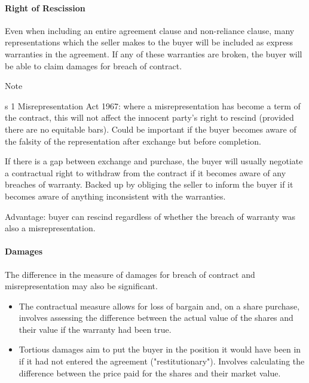\documentclass[
]{article}
\providecommand{\tightlist}{%
  \setlength{\itemsep}{0pt}\setlength{\parskip}{0pt}}
\newenvironment{env-48e9bfc8-c3dd-4504-a5fa-3b34b9a27ccf}
{
    \savenotes\tcolorbox[blanker,breakable,left=5pt,borderline west={2pt}{-4pt}{blue}]
}
{
    \endtcolorbox\spewnotes
}
\begin{document}
\hypertarget{right-of-rescission}{%
\paragraph{Right of Rescission}\label{right-of-rescission}}

Even when including an entire agreement clause and non-reliance clause,
many representations which the seller makes to the buyer will be
included as express warranties in the agreement. If any of these
warranties are broken, the buyer will be able to claim damages for
breach of contract.

\begin{env-48e9bfc8-c3dd-4504-a5fa-3b34b9a27ccf}

Note

s 1 Misrepresentation Act 1967: where a misrepresentation has become a
term of the contract, this will not affect the innocent party's right to
rescind (provided there are no equitable bars). Could be important if
the buyer becomes aware of the falsity of the representation after
exchange but before completion.

\end{env-48e9bfc8-c3dd-4504-a5fa-3b34b9a27ccf}

If there is a gap between exchange and purchase, the buyer will usually
negotiate a contractual right to withdraw from the contract if it
becomes aware of any breaches of warranty. Backed up by obliging the
seller to inform the buyer if it becomes aware of anything inconsistent
with the warranties.

Advantage: buyer can rescind regardless of whether the breach of
warranty was also a misrepresentation.

\hypertarget{damages-1}{%
\paragraph{Damages}\label{damages-1}}

The difference in the measure of damages for breach of contract and
misrepresentation may also be significant.

\begin{itemize}
\tightlist
\item
  The contractual measure allows for loss of bargain and, on a share
  purchase, involves assessing the difference between the actual value
  of the shares and their value if the warranty had been true.
\item
  Tortious damages aim to put the buyer in the position it would have
  been in if it had not entered the agreement ("restitutionary").
  Involves calculating the difference between the price paid for the
  shares and their market value.
\end{itemize}
\end{document}
